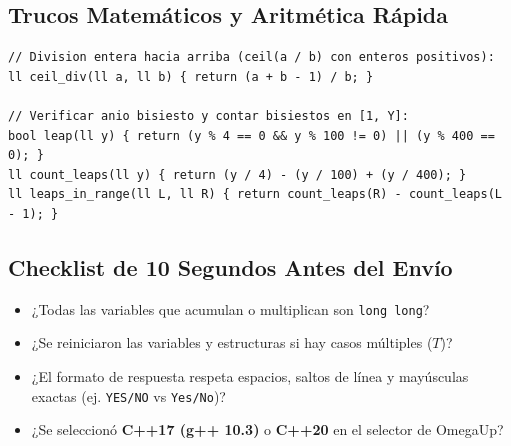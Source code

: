 \documentclass[9pt,twocolumn,a4paper]{extarticle}
\begin{document}
\subsection{Trucos Matemáticos y Aritmética Rápida}
\begin{lstlisting}
// Division entera hacia arriba (ceil(a / b) con enteros positivos):
ll ceil_div(ll a, ll b) { return (a + b - 1) / b; }

// Verificar anio bisiesto y contar bisiestos en [1, Y]:
bool leap(ll y) { return (y % 4 == 0 && y % 100 != 0) || (y % 400 == 0); }
ll count_leaps(ll y) { return (y / 4) - (y / 100) + (y / 400); }
ll leaps_in_range(ll L, ll R) { return count_leaps(R) - count_leaps(L - 1); }
\end{lstlisting}

\subsection{Checklist de 10 Segundos Antes del Envío}
\begin{itemize}
    \setlength{\itemsep}{0pt}
    \item[$\square$] ¿Todas las variables que acumulan o multiplican son \texttt{long long}?
    \item[$\square$] ¿Se reiniciaron las variables y estructuras si hay casos múltiples ($T$)?
    \item[$\square$] ¿El formato de respuesta respeta espacios, saltos de línea y mayúsculas exactas (ej. \texttt{YES/NO} vs \texttt{Yes/No})?
    \item[$\square$] ¿Se seleccionó \textbf{C++17 (g++ 10.3)} o \textbf{C++20} en el selector de OmegaUp?
\end{itemize}
\end{document}
